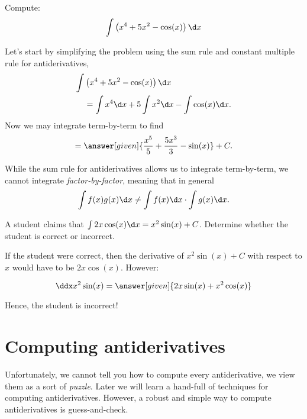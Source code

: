 \documentclass{ximera}
\begin{document}
\begin{example}
Compute:
\[
\int \left(x^4 + 5x^2 - \cos(x)\right) \d x
\]
\begin{explanation}
Let's start by simplifying the problem using the sum rule 
 and constant multiple rule for antiderivatives, 
\begin{align*}
\int &\left(x^4 + 5x^2 - \cos(x)\right) \d x\\
&= \int x^4 \d x + 5\int x^2 \d x - \int \cos(x) \d x.
\end{align*}
Now we may integrate term-by-term to find
\[
= \answer[given]{\frac{x^5}{5} + \frac{5x^3}{3}  - \sin(x)}+C.
\]
\end{explanation}
\end{example}


\begin{warning}
While the sum rule for antiderivatives allows us to integrate
term-by-term, we cannot integrate \textit{factor-by-factor}, meaning
that in general
\[
\int f(x)g(x) \d x \ne \int f(x) \d x\cdot \int g(x) \d x.
\]
\end{warning}


\begin{example}
  A student claims that $\int 2x \cos(x) \d x = x^2 \sin(x) +C$.  Determine whether the student is correct or incorrect.
  
  \begin{explanation}
    If the student were correct, then the derivative of $x^2 \sin(x) +C$ with respect to $x$ would have to be $2x \cos(x)$.  However:
    
      \[\ddx x^2 \sin(x) = \answer[given]{2x \sin(x) +x^2 \cos(x)} \]
      
 Hence, the student is incorrect!
  \end{explanation}
\end{example}






\section{Computing antiderivatives}


Unfortunately, we cannot tell you how to compute every antiderivative,
we view them as a sort of
\textit{puzzle}. Later we will learn a hand-full of techniques for
computing antiderivatives. However, a robust and simple way to compute
antiderivatives is guess-and-check.


\end{document}
